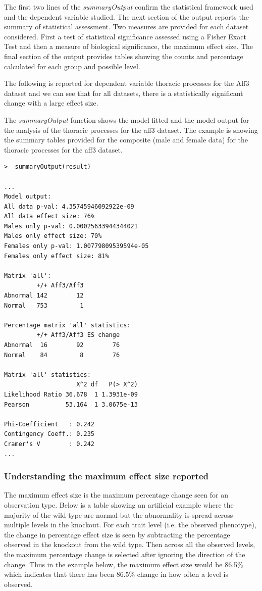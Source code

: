 \documentclass[12pt,a4paper]{article}
\begin{document}
The first two lines of the \textit{summaryOutput} confirm the statistical framework used and the dependent variable studied.  
The next section of the output reports the summary of statistical assessment. Two measures are provided for each dataset considered. 
First a test of statistical significance assessed using a Fisher Exact Test and then a measure of biological significance, the maximum effect size. 
The final section of the output provides tables showing the counts and percentage calculated for each group and possible level. 

The following is reported for dependent variable thoracic processes for the Aff3 dataset and we can see that for all datasets, there is a statistically significant change with a large effect size. 

The \textit{summaryOutput} function shows the model fitted and the model output for the analysis of the thoracic processes for the aff3 dataset. 
The example is showing the summary tables provided for the composite (male and female data) for the thoracic processes for the aff3 dataset. 

\begingroup
    \fontsize{8pt}{12pt}\selectfont
\begin{verbatim}
>  summaryOutput(result)

...
Model output:
All data p-val: 4.35745946092922e-09
All data effect size: 76%
Males only p-val: 0.00025633944344021
Males only effect size: 70%
Females only p-val: 1.00779809539594e-05
Females only effect size: 81%

Matrix 'all':
         +/+ Aff3/Aff3
Abnormal 142        12
Normal   753         1

Percentage matrix 'all' statistics:
         +/+ Aff3/Aff3 ES change
Abnormal  16        92        76
Normal    84         8        76

Matrix 'all' statistics:
                    X^2 df   P(> X^2)
Likelihood Ratio 36.678  1 1.3931e-09
Pearson          53.164  1 3.0675e-13

Phi-Coefficient   : 0.242 
Contingency Coeff.: 0.235 
Cramer's V        : 0.242 
...

\end{verbatim}
\endgroup 


\subsubsection{Understanding the maximum effect size reported}
The maximum effect size is the maximum percentage change seen for an observation type. 
Below is a table showing an artificial example where the majority of the wild type are normal but the abnormality is spread across multiple levels in the knockout. 
For each trait level (i.e. the observed phenotype), the change in percentage effect size is seen by subtracting the percentage observed in the knockout from the wild type. 
Then across all the observed levels, the maximum percentage change is selected after ignoring the direction of the change. 
Thus in the example below, the maximum effect size would be 86.5\% which indicates that there has been 86.5\% change in how often a level is observed.
\end{document}
